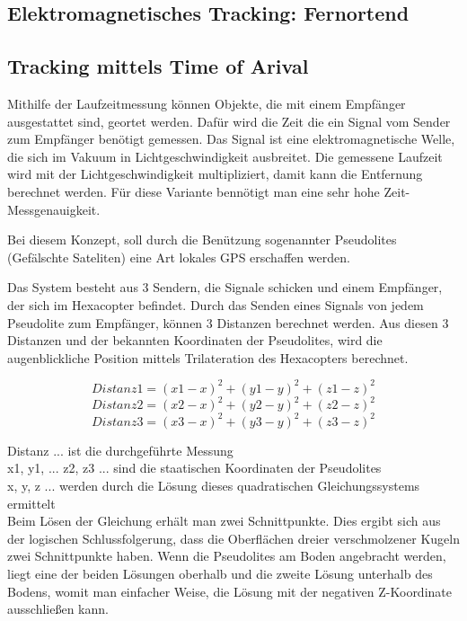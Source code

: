     \subsection{Elektromagnetisches Tracking: Fernortend}

      \subsection*{Tracking mittels Time of Arival}
      Mithilfe der Laufzeitmessung können Objekte, die mit einem Empfänger ausgestattet sind, geortet werden. Dafür wird die Zeit die ein Signal vom Sender zum Empfänger benötigt gemessen. Das Signal ist eine elektromagnetische Welle, die sich im Vakuum in Lichtgeschwindigkeit ausbreitet. Die gemessene Laufzeit wird mit der Lichtgeschwindigkeit multipliziert, damit kann die Entfernung berechnet werden. Für diese Variante bennötigt man eine sehr hohe Zeit-Messgenauigkeit.

      Bei diesem Konzept, soll durch die Benützung sogenannter Pseudolites (Gefälschte Sateliten) eine Art lokales GPS erschaffen werden.

      Das System besteht aus 3 Sendern, die Signale schicken und einem Empfänger, der sich im Hexacopter befindet.
      Durch das Senden eines Signals von jedem Pseudolite zum Empfänger, können 3 Distanzen berechnet werden.
      Aus diesen 3 Distanzen und der bekannten Koordinaten der Pseudolites, wird die augenblickliche Position mittels Trilateration\cite{pos_signal_2} des Hexacopters berechnet.

\[
      Distanz 1 = (x1 - x)^{2} + (y1 - y)^{2} + (z1 - z)^{2}
\]
\[
      Distanz 2 = (x2 - x)^{2} + (y2 - y)^{2} + (z2 - z)^{2}
\]
\[
      Distanz 3 = (x3 - x)^{2} + (y3 - y)^{2} + (z3 - z)^{2}
\]

      Distanz ... ist die durchgeführte Messung\\
      x1, y1, ... z2, z3 ... sind die staatischen Koordinaten der Pseudolites \\
      x, y, z ... werden durch die Lösung dieses quadratischen Gleichungssystems ermittelt \\

      Beim Lösen der Gleichung erhält man zwei Schnittpunkte. Dies ergibt sich aus der logischen Schlussfolgerung, dass die Oberflächen dreier verschmolzener Kugeln zwei Schnittpunkte haben.
      Wenn die Pseudolites am Boden angebracht werden, liegt eine der beiden Lösungen oberhalb und die zweite Lösung unterhalb des Bodens, womit man einfacher Weise, die Lösung mit der negativen Z-Koordinate ausschließen kann.

